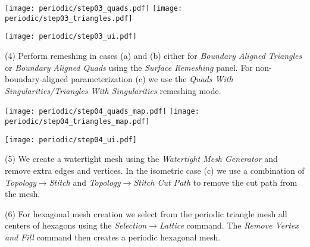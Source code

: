 \documentclass[Thesis.tex]{subfiles}
\begin{document}
\begin{compactenum}[(1)]
\begin{center}
\begin{minipage}{0.8\linewidth}
            \centering
            \texttt{[image: periodic/step03\_quads.pdf]}
            \texttt{[image: periodic/step03\_triangles.pdf]}		
\end{minipage}
\begin{minipage}{0.19\linewidth}
         	\texttt{[image: periodic/step03\_ui.pdf]}
\end{minipage}
\end{center}    

\item[(4)] Perform remeshing in cases (a) and (b) either for \emph{Boundary Aligned Triangles} or \emph{Boundary Aligned Quads} using the \emph{Surface Remeshing} panel. For non-boundary-aligned parameterization (c) we use the \emph{Quads With Singularities/Triangles With Singularities} remeshing mode.\\

\begin{center}
\begin{minipage}{0.75\linewidth}
            \centering
            \texttt{[image: periodic/step04\_quads\_map.pdf]}
            \texttt{[image: periodic/step04\_triangles\_map.pdf]}
\end{minipage}
\begin{minipage}{0.24\linewidth}
\texttt{[image: periodic/step04\_ui.pdf]}	
\end{minipage}
\end{center}    

\item[(5)] We create a watertight mesh using the \emph{Watertight Mesh Generator} and remove extra edges and vertices. In the isometric case (c) we use a combination of \emph{Topology$\to$Stitch} and \emph{Topology$\to$Stitch Cut Path} to remove the cut path from the mesh.
\item[(6)] For hexagonal mesh creation we select from the periodic triangle mesh all centers of hexagons using the \emph{Selection$\to$Lattice} command. The \emph{Remove Vertex and Fill} command then creates a periodic hexagonal mesh.
\begin{center}
\begin{minipage}{\linewidth}
            \centering
\end{minipage}
\end{center}                
\end{compactenum}
\end{document}
